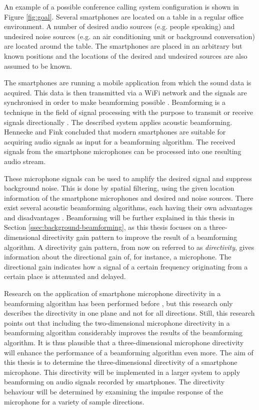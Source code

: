 An example of a possible conference calling system configuration is shown in Figure \ref{fig:goal}. Several smartphones are located on a table in a regular office environment. A number of desired audio sources (e.g. people speaking) and undesired noise sources (e.g. an air conditioning unit or background conversation) are located around the table. The smartphones are placed in an arbitrary but known positions and the locations of the desired and undesired sources are also assumed to be known. 

The smartphones are running a mobile application from which the sound data is acquired.
This data is then transmitted via a WiFi network and the signals are synchronised in order to make beamforming possible \cite{BAP:RoySjoerd}. 
Beamforming is a technique in the field of signal processing with the purpose to transmit or receive signals directionally \cite{VanVeen19884}.
The described system applies acoustic beamforming.
Hennecke and Fink \cite{hennecke2011towards} concluded that modern smartphones are suitable for acquiring audio signals as input for a beamforming algorithm.
The received signals from the smartphone microphones can be processed into one resulting audio stream.

These microphone signals can be used to amplify the desired signal and suppress background noise.
This is done by spatial filtering, using the given location information of the smartphone microphones and desired and noise sources.
There exist several acoustic beamforming algorithms, each having their own advantages and disadvantages \cite{BAP:ErikNiels}. 
Beamforming will be further explained in this thesis in Section \ref{ssec:background-beamforming}, as this thesis focuses on a three-dimensional directivity gain pattern to improve the result of a beamforming algorithm.
A directivity gain pattern, from now on referred to as \textit{directivity}, gives information about the directional gain of, for instance, a microphone.
The directional gain indicates how a signal of a certain frequency originating from a certain place is attenuated and delayed.

Research on the application of smartphone microphone directivity in a beamforming algorithm has been performed before \cite{Gaubitch2014}, but this research only describes the directivity in one plane and not for all directions.
Still, this research points out that including the two-dimensional microphone directivity in a beamforming algorithm considerably improves the results of the beamforming algorithm. 
It is thus plausible that a three-dimensional microphone directivity will enhance the performance of a beamforming algorithm even more. 
The aim of this thesis is to determine the three-dimensional directivity of a smartphone microphone.
This directivity will be implemented in a larger system to apply beamforming on audio signals recorded by smartphones. 
The directivity behaviour will be determined by examining the impulse response of the microphone for a variety of sample directions.

